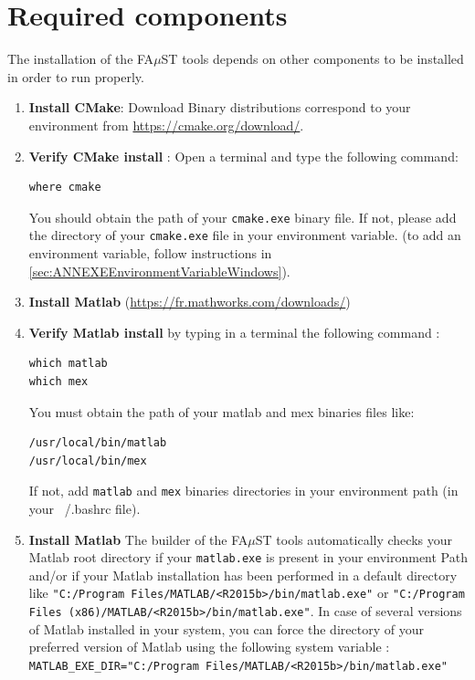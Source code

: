 \section{Required components}\label{sec:WinRequired}
The installation of the FA$\mu$ST tools depends on other components to be installed in order to run properly. 
\begin{enumerate}

\item \textbf{Install CMake}: Download Binary distributions correspond to your environment from \url{https://cmake.org/download/}.
\item \textbf{Verify CMake install} : Open a terminal and type the following command:
\begin{lstlisting}
where cmake
\end{lstlisting}
You should obtain the path of your \texttt{cmake.exe} binary file. If not, please add the directory of your \texttt{cmake.exe} file in your environment variable. (to add an environment variable, follow instructions in \ref{sec:ANNEXEEnvironmentVariableWindows}). 




\item \textbf{Install Matlab} (\url{https://fr.mathworks.com/downloads/})

\item \textbf{Verify Matlab install} by typing in a terminal the following command : 
\begin{lstlisting}
which matlab
which mex
\end{lstlisting}
You must obtain the path of your matlab and mex binaries files like: 
\begin{lstlisting}
/usr/local/bin/matlab
/usr/local/bin/mex
\end{lstlisting}
If not, add \texttt{matlab} and \texttt{mex} binaries directories in your environment path (in your ~/.bashrc file). 

\item \textbf{Install Matlab} The builder of the FA$\mu$ST tools automatically checks your Matlab root directory if your \texttt{matlab.exe} is present in your environment Path and/or if your Matlab installation has been performed in a default directory like \texttt{"C:/Program Files/MATLAB/<R2015b>/bin/matlab.exe"} or \texttt{"C:/Program Files (x86)/MATLAB/<R2015b>/bin/matlab.exe"}. In case of several versions of Matlab installed in your system, you can force the directory of your preferred version of Matlab using the following system variable : \\
\texttt{MATLAB\_EXE\_DIR="C:/Program Files/MATLAB/<R2015b>/bin/matlab.exe"}




\end{enumerate}
